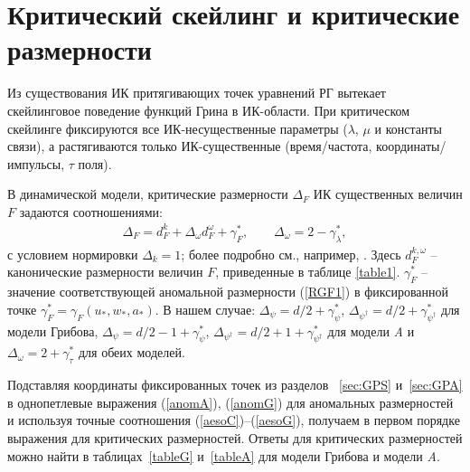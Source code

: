 \documentclass[a4paper,10pt]{article}
\begin{document}
\section{Критический скейлинг и критические размерности} \label{sec:DimeNS}

Из существования ИК притягивающих точек уравнений РГ вытекает скейлинговое поведение функций Грина в ИК-области.
При критическом скейлинге фиксируются все ИК-несущественные параметры  ($\lambda$, $\mu$ и константы связи), а
 растягиваются только ИК-существенные (время/частота, координаты/импульсы, $\tau$ поля).

В динамической модели, критические размерности $\Delta_{F}$  ИК существенных величин $F$ задаются соотношениями:
 \begin{eqnarray}
\Delta_{F} = d^{k}_{F}+ \Delta_{\omega} d^{\omega}_{F} + \gamma_{F}^{*},
\qquad  \Delta_{\omega}=2 -\gamma_{\lambda}^{*},
\label{dim}
\end{eqnarray}
с условием нормировки  $\Delta_{k} = 1$; более подробно см., например, \cite{Book3}.
Здесь $d^{k,\omega}_{F}$ -- канонические размерности величин $F$, приведенные в таблице \ref{table1}.
 $\gamma_{F}^{*}$ -- значение соответствующей аномальной размерности (\ref{RGF1}) в фиксированной точке $\gamma_{F}^{*} = \gamma_{F} (u_{*},w_{*},a_{*})$.
В нашем случае:
$\Delta_{\psi} = d/2+ \gamma_{\psi}^{*}$,
$\Delta_{\psi^{\dag}} = d/2+ \gamma_{\psi^{\dag}}^{*}$ для модели Грибова,
$\Delta_{\psi} = d/2-1+ \gamma_{\psi}^{*}$,
$\Delta_{\psi^{\dag}} = d/2+1+ \gamma_{\psi^{\dag}}^{*}$ для модели
{\it A} и $\Delta_{\omega} = 2 + \gamma_{\tau}^{*}$ для обеих моделей.

Подставляя координаты фиксированных точек из разделов ~\ref{sec:GPS}
и~\ref{sec:GPA} в однопетлевые выражения (\ref{anomA}),
(\ref{anomG}) для аномальных размерностей и используя точные соотношения  (\ref{aesoC})--(\ref{aesoG}), получаем в первом порядке выражения для критических размерностей.
Ответы для критических размерностей можно найти в таблицах~\ref{tableG}
и~\ref{tableA} для модели Грибова и модели  {\it A}.
\end{document}

